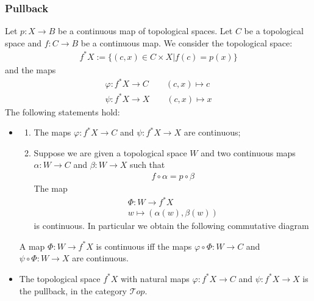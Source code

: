 \documentclass[Total.tex]{subfiles}
\begin{document}
				\subsubsection{Pullback}
				\begin{proposition}
					Let $p:X\rightarrow B$ be a continuous map of topological spaces. Let $C$ be a topological space and $f:C\rightarrow B$ be a continuous map. We consider the topological space:
					\begin{gather*}
						f^*X:=\{(c,x)\in C\times X|f(c)=p(x)\}
					\end{gather*}
					and the maps
					\begin{gather*}
						\varphi:f^*X\rightarrow C\qquad (c,x)\mapsto c\\
						\psi:f^*X\rightarrow X\qquad (c,x)\mapsto x
					\end{gather*}
					The following statements hold:
					\begin{itemize}
						\item \begin{enumerate}
							\item The maps $\varphi:f^*X\rightarrow C$ and $\psi:f^*X\rightarrow X$ are continuous;
							\item Suppose we are given a topological space $W$ and two continuous maps $\alpha:W\rightarrow C$ and $\beta:W\rightarrow X$ such that
							\begin{gather*}
								f\circ \alpha=p\circ \beta
							\end{gather*}
							The map
							\begin{gather*}
								\Phi:W\rightarrow f^*X\\
								w\mapsto (\alpha(w),\beta(w))
							\end{gather*}
							is continuous. In particular we obtain the following commutative diagram
							\begin{center}
							\end{center}
						\end{enumerate}
						A map $\Phi:W\rightarrow f^*X$ is continuous iff the maps $\varphi\circ\Phi:W\rightarrow C$ and $\psi\circ\Phi:W\rightarrow X$ are continuous.
						\item The topological space $f^*X$ with natural maps $\varphi:f^*X\rightarrow C$ and $\psi:f^*X\rightarrow X$ is the pullback, in the category $\mathcal Top$.
					\end{itemize}
				\end{proposition}
\end{document}
